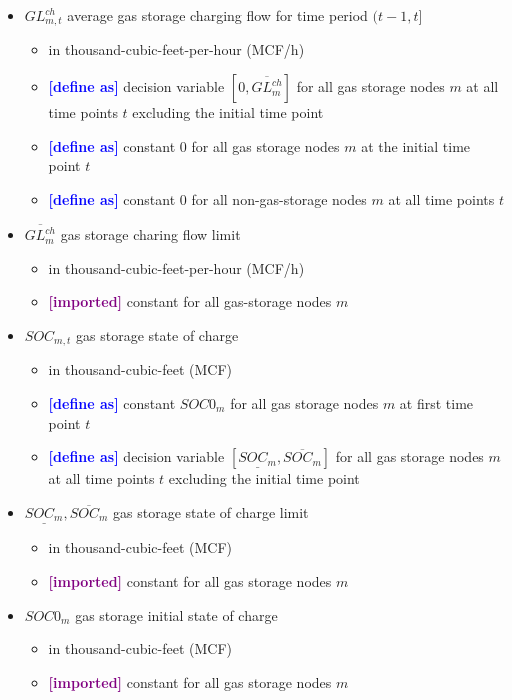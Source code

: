 \documentclass{article}
\newcommand{\lo}[1]{\underline{#1}}
\newcommand{\hi}[1]{\overline{#1}}
\newcommand{\define}{\textcolor{blue}{\textbf{[define as] }}}
\newcommand{\imported}{\textcolor{purple}{\textbf{[imported] }}}
\begin{document}
\begin{itemize}
\item $GL^{ch}_{m,t}$ average gas storage charging flow for time period $(t-1,
  t]$
  \begin{itemize}
  \item in thousand-cubic-feet-per-hour (MCF/h)
  \item \define decision variable $[0, \hi{GL^{ch}_m}]$ for all gas storage
    nodes $m$ at all time points $t$ excluding the initial time point
  \item \define constant $0$ for all gas storage nodes $m$ at the initial time
    point $t$
  \item \define constant $0$ for all non-gas-storage nodes $m$ at all time
    points $t$
  \end{itemize}

\item $\hi{GL^{ch}_m}$ gas storage charing flow limit
  \begin{itemize}
  \item in thousand-cubic-feet-per-hour (MCF/h)
  \item \imported constant for all gas-storage nodes $m$
  \end{itemize}

\item $SOC_{m,t}$ gas storage state of charge
  \begin{itemize}
  \item in thousand-cubic-feet (MCF)
  \item \define constant $SOC0_m$ for all gas storage nodes $m$ at first time
    point $t$
  \item \define decision variable $[\lo{SOC_m}, \hi{SOC_m}]$ for all gas storage
    nodes $m$ at all time points $t$ excluding the initial time point
  \end{itemize}

\item $\lo{SOC_m}, \hi{SOC_m}$ gas storage state of charge limit
  \begin{itemize}
  \item in thousand-cubic-feet (MCF)
  \item \imported constant for all gas storage nodes $m$
  \end{itemize}

\item $SOC0_m$ gas storage initial state of charge
  \begin{itemize}
  \item in thousand-cubic-feet (MCF)
  \item \imported constant for all gas storage nodes $m$
  \end{itemize}


\end{itemize}
\end{document}

